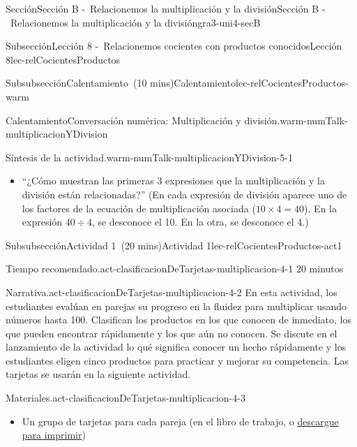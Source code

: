\documentclass[oneside,10pt,]{article}
\begin{document}
\begin{sectionptx}{Sección}{Sección B -~Relacionemos la multiplicación y la división}{}{Sección B -~Relacionemos la multiplicación y la división}{}{}{gra3-uni4-secB}
\begin{subsectionptx}{Subsección}{Lección 8 -~Relacionemos cocientes con productos conocidos}{}{Lección 8}{}{}{lec-relCocientesProductos}
\begin{subsubsectionptx}{Subsubsección}{Calentamiento~(10 mins)}{}{Calentamiento}{}{}{lec-relCocientesProductos-warm}
\begin{exploration}{Calentamiento}{Conversación numérica: Multiplicación y división.}{warm-numTalk-multiplicacionYDivision}
\begin{enumerate}[label={\Alph*.}]
\end{enumerate}
\end{exploration}%
\par
\begin{paragraphs}{Síntesis de la actividad.}{warm-numTalk-multiplicacionYDivision-5-1}%
%
\begin{itemize}[label=\textbullet]
\item{}``¿Cómo muestran las primeras 3 expresiones que la multiplicación y la división están relacionadas?'' (En cada expresión de división aparece uno de los factores de la ecuación de multiplicación asociada (\(10 \times 4 = 40\)). En la expresión \(40\div 4\), se desconoce el 10. En la otra, se desconoce el 4.)%
\end{itemize}
\end{paragraphs}%
\end{subsubsectionptx}
%
%
\typeout{************************************************}
\typeout{************************************************}
%
\begin{subsubsectionptx}{Subsubsección}{Actividad 1~(20 mins)}{}{Actividad 1}{}{}{lec-relCocientesProductos-act1}
\par
\begin{paragraphs}{Tiempo recomendado.}{act-clasificacionDeTarjetas-multiplicacion-4-1}%
20 minutos%
\end{paragraphs}%
\begin{paragraphs}{Narrativa.}{act-clasificacionDeTarjetas-multiplicacion-4-2}%
En esta actividad, los estudiantes evalúan en parejas su progreso en la fluidez para multiplicar usando números hasta 100. Clasifican los productos en los que conocen de inmediato, los que pueden encontrar rápidamente y los que aún no conocen. Se discute en el lanzamiento de la actividad lo qué significa conocer un hecho rápidamente y los estudiantes eligen cinco productos para practicar y mejorar su competencia. Las tarjetas se usarán en la siguiente actividad.%
\end{paragraphs}%
\begin{paragraphs}{Materiales.}{act-clasificacionDeTarjetas-multiplicacion-4-3}%
%
\begin{itemize}[label=\textbullet]
\item{}Un grupo de tarjetas para cada pareja (en el libro de trabajo, o \href{external/blm/tikz-source/clasificacionTarjetas-multiplicacion-blm.pdf}{descargue para imprimir}\footnotemark{})%

\end{itemize}
\end{paragraphs}
\end{subsubsectionptx}
\end{subsectionptx}
\end{sectionptx}
\end{document}
